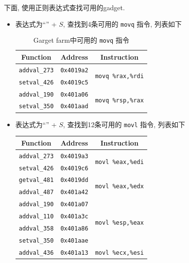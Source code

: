 下面, 使用正则表达式查找可用的gadget.
\begin{itemize}[noitemsep]
    \item 表达式为``'' + $S$, 查找到4条可用的 \verb|movq| 指令, 列表如下
    \begin{table}[H]
        \centering
        \small
        \begin{tabular}{ccc}
            \toprule
            Function & Address  & Instruction \\
            \midrule
            \verb|addval_273| & \verb|0x4019a2| & \multirow{2}{*}{ \texttt{movq \%rax,\%rdi}} \\
            \verb|setval_426| & \verb|0x4019c5| & \\
            \midrule
            \verb|addval_190| & \verb|0x401a06| & \multirow{2}{*}{ \texttt{movq \%rsp,\%rax}}\\
            \verb|setval_350| & \verb|0x401aad| & \\
            \bottomrule
        \end{tabular}
        \caption{Garget farm中可用的 \texttt{movq} 指令}\label{mymovq}
    \end{table}
    \item 表达式为``'' + $S$, 查找到12条可用的 \verb|movl| 指令, 列表如下
    \begin{table}[H]
        \centering
        \small
        \begin{tabular}{ccc}
            \toprule
            Function & Address  & Instruction \\
            \midrule
            \verb|addval_273| & \verb|0x4019a3| & \multirow{2}{*}{ \texttt{movl \%eax,\%edi}} \\
            \verb|setval_426| & \verb|0x4019c6| & \\
            \midrule
            \verb|getval_481| & \verb|0x4019dd| & \multirow{2}{*}{ \texttt{movl \%eax,\%edx}} \\
            \verb|addval_487| & \verb|0x401a42| & \\
            \midrule
            \verb|addval_190| & \verb|0x401a07| & \multirow{4}{*}{ \texttt{movl \%esp,\%eax}} \\
            \verb|addval_110| & \verb|0x401a3c| & \\
            \verb|addval_358| & \verb|0x401a86| & \\
            \verb|setval_350| & \verb|0x401aae| & \\
            \midrule
            \verb|addval_436| & \verb|0x401a13| & \multirow{2}{*}{ \texttt{movl \%ecx,\%esi}} \\

\end{tabular}
\end{table}
\end{itemize}
